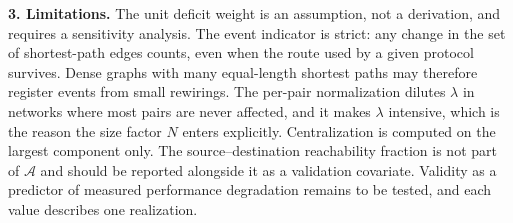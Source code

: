 \documentclass[10pt,a4paper]{article}
\begin{document}
\textbf{3. Limitations.} The unit deficit weight is an assumption, not a derivation, and requires a sensitivity analysis. The event indicator is strict: any change in the set of shortest-path edges counts, even when the route used by a given protocol survives. Dense graphs with many equal-length shortest paths may therefore register events from small rewirings. The per-pair normalization dilutes $\lambda$ in networks where most pairs are never affected, and it makes $\lambda$ intensive, which is the reason the size factor $N$ enters explicitly. Centralization is computed on the largest component only. The source--destination reachability fraction is not part of $\mathcal{A}$ and should be reported alongside it as a validation covariate. Validity as a predictor of measured performance degradation remains to be tested, and each value describes one realization.
\end{document}
